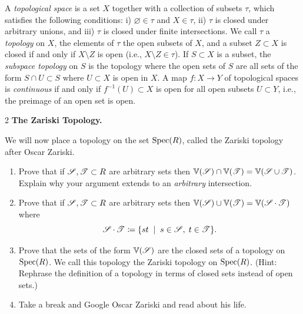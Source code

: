 \documentclass[Notebook.tex]{subfiles}
\begin{document}
\hrulefill

A \emph{topological space} is a set $X$ together with a collection of subsets $\tau$, which satisfies the following conditions: i) $\varnothing \in \tau$ and $X \in \tau$, ii) $\tau$ is closed under arbitrary unions, and iii) $\tau$ is closed under finite intersections. We call $\tau$ a \emph{topology} on $X$, the elements of $\tau$ the open subsets of $X$, and a subset $Z \subset X$ is closed if and only if $X\setminus Z$ is open (i.e., $X \setminus Z \in \tau$). If $S \subset X$ is a subset, the \emph{subspace topology} on $S$ is the topology where the open sets of $S$ are all sets of the form $S \cap U \subset S$ where $U \subset X$ is open in $X$. A map $f: X \to Y$ of topological spaces is \emph{continuous} if and only if $f^{-1}(U) \subset X$ is open for all open subsets $U \subset Y$, i.e., the preimage of an open set is open. 

\hrulefill

\newpage 

\begin{problem}{2} \textbf{The Zariski Topology.} 

    We will now place a topology on the set $\operatorname{Spec}(R)$,  called the Zariski topology after Oscar Zariski. 
    \begin{enumerate}[label=(\alph*),ref=\theenumi\alph*]
        \item Prove that if  $\operatorname{\mathscr S}, \operatorname{\mathscr T} \subset R$ are arbitrary sets then $\mathbb V(\operatorname{\mathscr S}) \cap \mathbb V(\operatorname{\mathscr T}) = \mathbb V(\operatorname{\mathscr S} \cup \operatorname{\mathscr T})$. Explain why your argument extends to an \emph{arbitrary} intersection. 
        \item Prove that if  $\operatorname{\mathscr S}, \operatorname{\mathscr T} \subset R$ are arbitrary sets then $\mathbb V(\operatorname{\mathscr S}) \cup \mathbb V(\operatorname{\mathscr T}) = \mathbb V(\operatorname{\mathscr S} \cdot \operatorname{\mathscr T})$ where 
        \[\operatorname{\mathscr S} \cdot \operatorname{\mathscr T} \coloneqq \{ st \;\; |\;\; s \in \operatorname{\mathscr S},\; t \in \operatorname{\mathscr T}\}.\]
        \item Prove that the sets of the form $\mathbb V(\operatorname{\mathscr S})$ are the closed sets of a topology on $\operatorname{Spec}(R)$. We call this topology the Zariski topology on $\operatorname{Spec}(R)$. (Hint: Rephrase the definition of a topology in terms of closed sets instead of open sets.) 
        \item Take a break and Google Oscar Zariski and read about his life. 
    \end{enumerate}
\end{problem}
    
\end{document}
